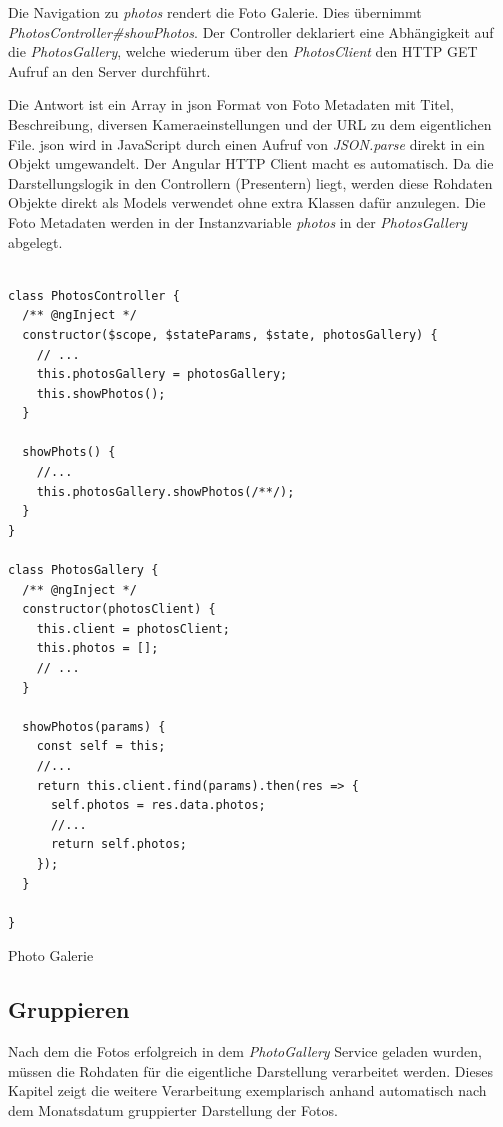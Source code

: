 Die Navigation zu \textit{\/photos} rendert die Foto Galerie. Dies übernimmt  \textit{PhotosController\#showPhotos}. Der Controller deklariert eine Abhängigkeit auf die \textit{PhotosGallery}, welche wiederum über den \textit{PhotosClient} den HTTP GET Aufruf an den Server durchführt. 

Die Antwort ist ein Array in \gls{json} Format von Foto Metadaten mit Titel, Beschreibung, diversen Kameraeinstellungen und der URL zu dem eigentlichen File. \gls{json} wird in JavaScript durch einen Aufruf von \textit{JSON.parse} direkt in ein Objekt umgewandelt. Der Angular HTTP Client macht es automatisch. Da die Darstellungslogik in den Controllern (Presentern) liegt, werden diese Rohdaten Objekte direkt als Models verwendet ohne extra Klassen dafür anzulegen. Die Foto Metadaten werden in der Instanzvariable \textit{photos} in der \textit{PhotosGallery} abgelegt. 


\begin{listing}[H]
\begin{verbatim}

class PhotosController {
  /** @ngInject */
  constructor($scope, $stateParams, $state, photosGallery) {
    // ...
    this.photosGallery = photosGallery;
    this.showPhotos();
  }

  showPhots() {
    //...
    this.photosGallery.showPhotos(/**/);
  }
}

class PhotosGallery {
  /** @ngInject */
  constructor(photosClient) {
    this.client = photosClient;
    this.photos = [];
    // ...
  }
    
  showPhotos(params) {
    const self = this;
    //...
    return this.client.find(params).then(res => {
      self.photos = res.data.photos; 
      //...
      return self.photos;
    });
  }

}

\end{verbatim}
\caption{Photo Galerie}
\label{lst:photo_gallery}
\end{listing} 

\subsection{Gruppieren}

Nach dem die Fotos erfolgreich in dem \textit{PhotoGallery} Service geladen wurden, müssen die Rohdaten für die eigentliche Darstellung verarbeitet werden. Dieses Kapitel zeigt die weitere Verarbeitung exemplarisch anhand automatisch nach dem Monatsdatum gruppierter Darstellung der Fotos.

